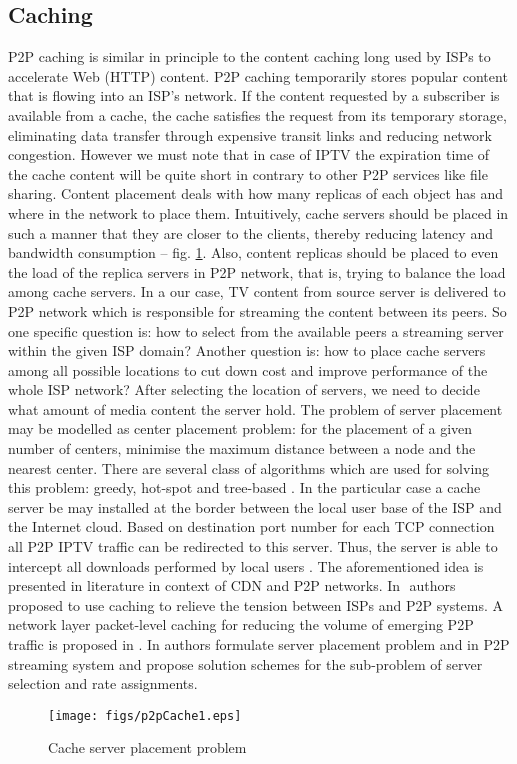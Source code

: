 \documentclass[10pt, conference, compsocconf]{IEEEtran}
\begin{document}
\subsection{Caching}
P2P caching is similar in principle to the content caching long used by ISPs to accelerate Web (HTTP) content. P2P caching temporarily stores popular content that is flowing into an ISP’s network. If the content requested by a subscriber is available from a cache, the cache satisfies the request from its temporary storage, eliminating data transfer through expensive transit links and reducing network congestion. However we must note that in case of IPTV the expiration time of the cache content will be quite short in contrary to other P2P services like file sharing. Content placement deals with how many replicas of each object has and where in the network to place them. Intuitively, cache servers should be placed in such a manner that they are closer to the clients, thereby reducing latency and bandwidth consumption -- fig. \ref{fig:p2pCache1}. Also, content replicas should be placed to even the load of the replica servers in P2P network, that is, trying to balance the load among cache servers. In a our case, TV content from source server is delivered to P2P network which is responsible for streaming the content between its peers. So one specific question is: how to select from the available peers a streaming server within the given ISP domain? Another question is: how to place cache servers among all possible locations to cut down cost and improve performance of the whole ISP network? After selecting the location of servers, we need to decide what amount of media content the server hold. The problem of server placement may be modelled as center placement problem: for the placement of a given number of centers, minimise the maximum distance between a node and the nearest center. There are several class of algorithms which are used for solving this problem: greedy, hot-spot and tree-based \cite{weigmann_center_1997}⁠. In the particular case a cache server be may installed at the border between the local user base of the ISP and the Internet cloud. Based on destination port number for each TCP connection all P2P IPTV traffic can be redirected to this server. Thus, the server is able to intercept all downloads performed by local users \cite{wierzbicki_cache_2004}.
The aforementioned idea is presented in literature in context of CDN and P2P networks. In \cite{shen_hptp:_2007}⁠ authors proposed to use caching to relieve the tension between ISPs and P2P systems. A network layer packet-level caching for reducing the volume of emerging P2P traffic is proposed in \cite{nakao_remedy_2008}⁠. In \cite{chen_server_2008} authors formulate server placement problem and in P2P streaming system and propose solution schemes for the sub-problem of server selection and rate assignments.
\begin{figure}[!t]
\centering
\texttt{[image: figs/p2pCache1.eps]}
\caption{Cache server placement problem}
\label{fig:p2pCache1}
\end{figure}
\end{document}
